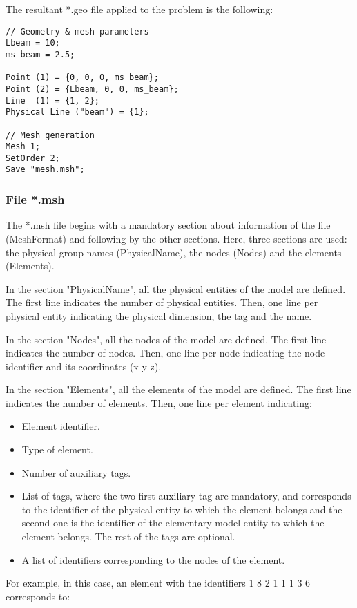 \documentclass[a4]{article}
\begin{document}
The resultant *.geo file applied to the problem is the following:

\begin{Verbatim}
// Geometry & mesh parameters
Lbeam = 10;
ms_beam = 2.5;

Point (1) = {0, 0, 0, ms_beam};
Point (2) = {Lbeam, 0, 0, ms_beam};
Line  (1) = {1, 2};
Physical Line ("beam") = {1};

// Mesh generation
Mesh 1;
SetOrder 2;
Save "mesh.msh";
\end{Verbatim}

\subsubsection{File *.msh}

The *.msh file begins with a mandatory section about information of the file (MeshFormat) and following by the other sections. Here, three sections are used: the physical group names (PhysicalName), the nodes (Nodes) and the elements (Elements).

In the section "PhysicalName", all the physical entities of the model are defined. The first line
indicates the number of physical entities. Then, one line per physical entity indicating the physical dimension, the tag and the name.  

In the section "Nodes", all the nodes of the model are defined. The first line indicates the number of nodes. Then, one line per node indicating the node identifier and its coordinates (x y z).

In the section "Elements", all the elements of the model are defined. The first line indicates the number of elements. Then, one line per element indicating:


\begin{itemize}
	\item Element identifier.
	\item Type of element.
	\item Number of auxiliary tags.
	\item List of tags, where the two first auxiliary tag are mandatory, and corresponds to the identifier of the physical entity to which the element belongs and the second one is the identifier of the elementary model entity to which the element belongs. The rest of the tags are optional.
	\item A list of identifiers corresponding to the nodes of the element.
\end{itemize}

For example, in this case, an element with the identifiers 1 8 2 1 1 1 3 6 corresponds to:
\end{document}
